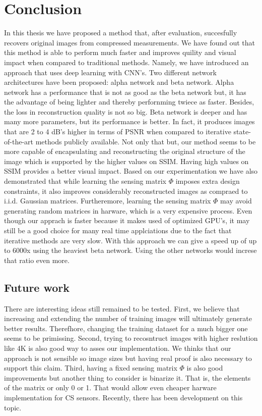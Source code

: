 \chapter{Conclusion}
In this thesis we have proposed a method that, after evaluation, succesfully recovers original images from compressed measurements. We have found out that this method is able to perform much faster and improves quility and visual impact when compared to traditional methods. Namely, we have introduced an approach that uses deep learning with CNN's. Two different network architectures have been proposed: alpha network and beta network. Alpha network has a performance that is not as good as the beta network but, it has the advantage of being lighter and thereby perfornming twiece as faster. Besides, the loss in reconstruction quality is not so big. Beta network is deeper and has many more parameters, but its performance is better. In fact, it produces images that are 2 to 4 dB's higher in terms of PSNR when compared to iterative state-of-the-art methods publicly available. Not only that but, our method seems to be more capable of encapsulating and reconstructing the original structure of the image which is supported by the higher values on SSIM. Having high values on SSIM provides a better visual impact.
\newline \newline 
Based on our experimentation we have also demonstrated that while learning the sensing matrix $\Phi$ imposes extra design constraints, it also improves considerably reconstructed images as compraed to i.i.d. Gaussian matrices. Furtheremore, learning the sensing matrix $\Phi$ may avoid generating random matrices in harware, which is a very expensive process.
\newline \newline
Even though our apprach is faster because it makes used of optimized GPU's, it may still be a good choice for many real time applciations due to the fact that iterative methods are very slow. With this approach we can give a speed up of up to 6000x using the heaviest beta network. Using the other networks would increse that ratio even more.    


\section{Future work}
There are interesting ideas still remained to be tested. First, we believe that increasing and extending the number of training images will ultimately generate better results. Therefhore, changing the training dataset for a much bigger one seems to be primissing. Second, trying to recosntruct images with higher reslution like 4K is also good way to asses our implementation. We thinks that our approach is not sensible so image sizes but having real proof is also necessary to support this claim. Third, having a fixed sensing matrix $\Phi$ is also good improvements but another thing to consider is binarize it.  That is, the elements of the matrix or only 0 or 1. That would allow even cheaper harware implementation for CS sensors. Recently, there has been development on this topic.    




